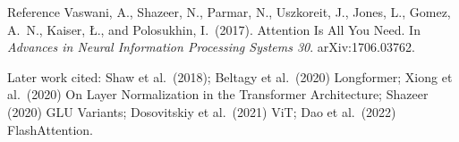 \documentclass[aspectratio=169,11pt]{beamer}
\begin{document}
\begin{frame}{Reference}
  \small
  Vaswani, A., Shazeer, N., Parmar, N., Uszkoreit, J., Jones, L., Gomez, A.\ N., Kaiser, {\L}., and Polosukhin, I.\ (2017). Attention Is All You Need. In \emph{Advances in Neural Information Processing Systems 30}. arXiv:1706.03762.
  \vspace{3mm}

  {\footnotesize Later work cited: Shaw et al.\ (2018); Beltagy et al.\ (2020) Longformer; Xiong et al.\ (2020) On Layer Normalization in the Transformer Architecture; Shazeer (2020) GLU Variants; Dosovitskiy et al.\ (2021) ViT; Dao et al.\ (2022) FlashAttention.}
\end{frame}
\end{document}
